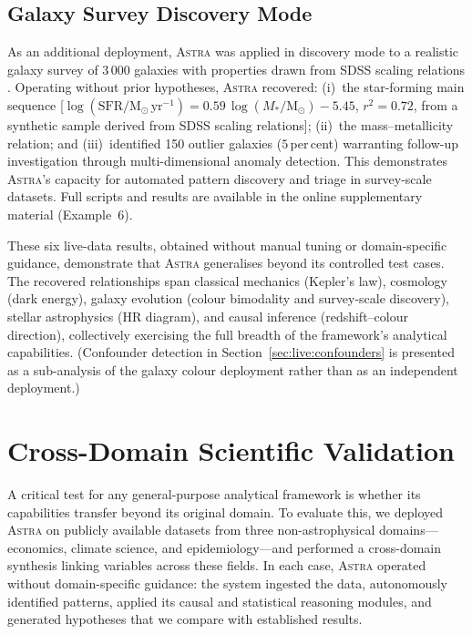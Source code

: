 \documentclass[usenatbib]{rasti}
\newcommand{\astra}{\textsc{Astra}\xspace}
\begin{document}
\subsection{Galaxy Survey Discovery Mode}
\label{sec:live:galaxy}

As an additional deployment, \astra was applied in discovery mode to a realistic galaxy survey of 3\,000 galaxies with properties drawn from SDSS scaling relations \citep{Elbaz2007,Mannucci2010}.
Operating without prior hypotheses, \astra recovered: (i)~the star-forming main sequence [$\log(\mathrm{SFR}/\mathrm{M}_{\odot}\,\mathrm{yr}^{-1}) = 0.59\,\log(M_*/\mathrm{M}_{\odot}) - 5.45$, $r^2 = 0.72$, from a synthetic sample derived from SDSS scaling relations]; (ii)~the mass--metallicity relation; and (iii)~identified 150 outlier galaxies ($5$\,per\,cent) warranting follow-up investigation through multi-dimensional anomaly detection.
This demonstrates \astra's capacity for automated pattern discovery and triage in survey-scale datasets.
Full scripts and results are available in the online supplementary material (Example~6).

\medskip

These six live-data results, obtained without manual tuning or domain-specific guidance, demonstrate that \astra generalises beyond its controlled test cases.
The recovered relationships span classical mechanics (Kepler's law), cosmology (dark energy), galaxy evolution (colour bimodality and survey-scale discovery), stellar astrophysics (HR diagram), and causal inference (redshift--colour direction), collectively exercising the full breadth of the framework's analytical capabilities.
(Confounder detection in Section~\ref{sec:live:confounders} is presented as a sub-analysis of the galaxy colour deployment rather than as an independent deployment.)

\section{Cross-Domain Scientific Validation}
\label{sec:crossdomain}

A critical test for any general-purpose analytical framework is whether its capabilities transfer beyond its original domain.
To evaluate this, we deployed \astra on publicly available datasets from three non-astrophysical domains---economics, climate science, and epidemiology---and performed a cross-domain synthesis linking variables across these fields.
In each case, \astra operated without domain-specific guidance: the system ingested the data, autonomously identified patterns, applied its causal and statistical reasoning modules, and generated hypotheses that we compare with established results.
\end{document}
